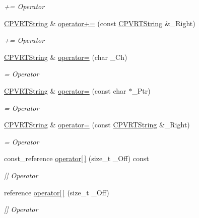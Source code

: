 \begin{DoxyCompactItemize}
\begin{DoxyCompactList}\small\item\em += Operator \end{DoxyCompactList}\item 
\hyperlink{class_c_p_v_r_t_string}{C\+P\+V\+R\+T\+String} \& \hyperlink{class_c_p_v_r_t_string_ae0d887649bdc4f8182e6237a9e3e4a32}{operator+=} (const \hyperlink{class_c_p_v_r_t_string}{C\+P\+V\+R\+T\+String} \&\+\_\+\+Right)
\begin{DoxyCompactList}\small\item\em += Operator \end{DoxyCompactList}\item 
\hyperlink{class_c_p_v_r_t_string}{C\+P\+V\+R\+T\+String} \& \hyperlink{class_c_p_v_r_t_string_a4d8d2df189dd3cd75eec135b6ef8620d}{operator=} (char \+\_\+\+Ch)
\begin{DoxyCompactList}\small\item\em = Operator \end{DoxyCompactList}\item 
\hyperlink{class_c_p_v_r_t_string}{C\+P\+V\+R\+T\+String} \& \hyperlink{class_c_p_v_r_t_string_aabf81b6f788ff43281378b7b645aac41}{operator=} (const char $\ast$\+\_\+\+Ptr)
\begin{DoxyCompactList}\small\item\em = Operator \end{DoxyCompactList}\item 
\hyperlink{class_c_p_v_r_t_string}{C\+P\+V\+R\+T\+String} \& \hyperlink{class_c_p_v_r_t_string_a91892213650330c9be9473d6abbb6c1a}{operator=} (const \hyperlink{class_c_p_v_r_t_string}{C\+P\+V\+R\+T\+String} \&\+\_\+\+Right)
\begin{DoxyCompactList}\small\item\em = Operator \end{DoxyCompactList}\item 
const\+\_\+reference \hyperlink{class_c_p_v_r_t_string_ad452cd45908e65c5e5526e5de25882d8}{operator\mbox{[}$\,$\mbox{]}} (size\+\_\+t \+\_\+\+Off) const 
\begin{DoxyCompactList}\small\item\em \mbox{[}\mbox{]} Operator \end{DoxyCompactList}\item 
reference \hyperlink{class_c_p_v_r_t_string_aaa4c9bafcefe5062a402bf3ffaa83a4b}{operator\mbox{[}$\,$\mbox{]}} (size\+\_\+t \+\_\+\+Off)
\begin{DoxyCompactList}\small\item\em \mbox{[}\mbox{]} Operator \end{DoxyCompactList}\end{DoxyCompactItemize}
